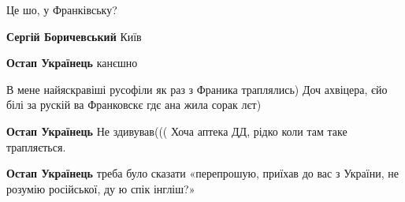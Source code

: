 \begin{itemize}
 
Це шо, у Франківську?

\begin{itemize}
 
\textbf{Сергій Боричевський} Київ

 
\textbf{Остап Українець} канєшно

 
В мене найяскравіші русофіли як раз з Франика траплялись) Доч ахвіцера, єйо білі за рускій ва Франковскє гдє ана жила сорак лєт)

 
\textbf{Остап Українець} Не здивував((( Хоча аптека ДД, рідко коли там таке трапляється.

 
\textbf{Остап Українець} треба було сказати «перепрошую, приїхав до вас з України, не розумію російської, ду ю спік інгліш?»

 

\end{itemize}
\end{itemize}
